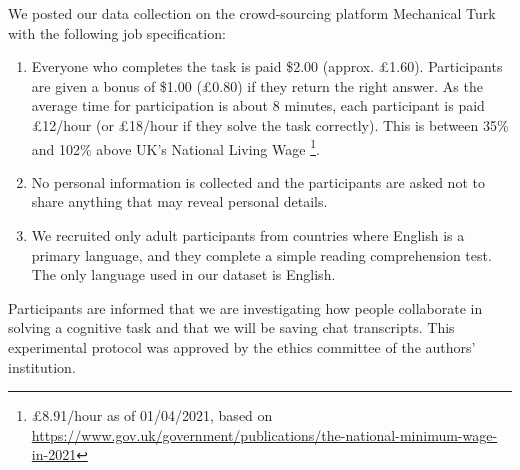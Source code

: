 \documentclass[acmsmall,manuscript,screen]{acmart}
\begin{document}
We posted our data collection on the crowd-sourcing platform Mechanical Turk with the following job specification:
\begin{enumerate}
\item Everyone who completes the task is paid \$2.00 (approx. £1.60). Participants are given a bonus of \$1.00 (£0.80) if they return the right answer.
    As the average time for participation is about 8 minutes, each participant is paid £12/hour (or £18/hour if they solve the task correctly). This is between 35\% and 102\% above UK's National Living Wage \footnote{£8.91/hour as of 01/04/2021, based on \url{https://www.gov.uk/government/publications/the-national-minimum-wage-in-2021}}.  
    \item No personal information is collected and the participants are asked not to share anything that may reveal personal details.
    \item We recruited only adult participants from countries where English is a primary language, and they complete a simple reading comprehension test. The only language used in our dataset is English.   
\end{enumerate}
 Participants are informed that we are investigating how people collaborate in solving a cognitive task and that we will be saving chat transcripts. This experimental protocol was approved by the ethics committee of the authors' institution.
 
\end{document}
